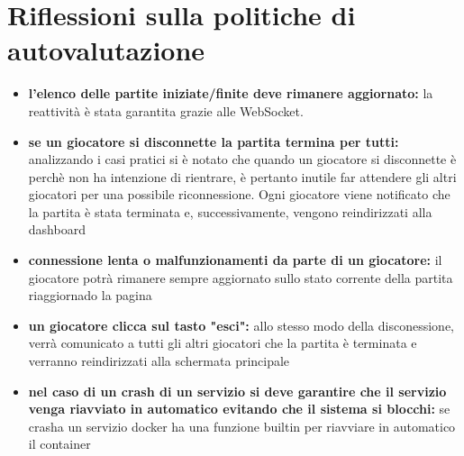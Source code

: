 \section{Riflessioni sulla politiche di autovalutazione}
\begin{itemize}
    \item \textbf{l'elenco delle partite iniziate/finite deve rimanere aggiornato:} la reattività è stata garantita grazie alle WebSocket. 
    \item \textbf{se un giocatore si disconnette la partita termina per tutti:}
    analizzando i casi pratici si è notato che quando un giocatore si disconnette è perchè non ha intenzione di rientrare, è pertanto inutile far attendere gli altri giocatori per una possibile riconnessione.
    Ogni giocatore viene notificato che la partita è stata terminata e, successivamente, vengono reindirizzati alla dashboard
    \item \textbf{connessione lenta o malfunzionamenti da parte di un giocatore:} il giocatore potrà rimanere sempre aggiornato sullo stato corrente della partita riaggiornado la pagina
    \item \textbf{un giocatore clicca sul tasto "esci":} allo stesso modo della disconessione, verrà comunicato a tutti gli altri giocatori che la partita è terminata e verranno reindirizzati alla schermata principale
    \item \textbf{nel caso di un crash di un servizio si deve garantire che il servizio venga riavviato in automatico evitando che il sistema si blocchi:}
    se crasha un servizio docker ha una funzione builtin per riavviare in automatico il container
\end{itemize}

